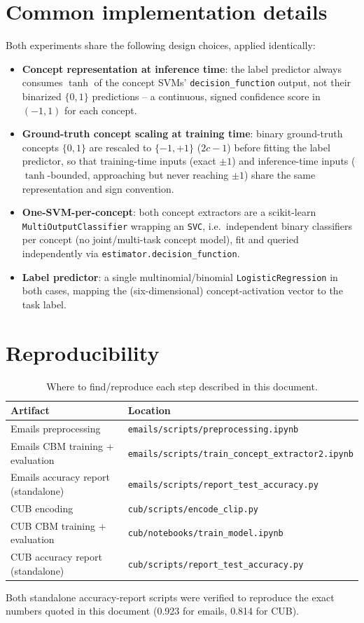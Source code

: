 \documentclass[11pt]{article}
\newcommand{\code}[1]{\texttt{#1}}
\begin{document}
\section{Common implementation details}

Both experiments share the following design choices, applied identically:

\begin{itemize}[leftmargin=*]
    \item \textbf{Concept representation at inference time}: the label
    predictor always consumes $\tanh$ of the concept SVMs'
    \code{decision\_function} output, not their binarized $\{0,1\}$
    predictions -- a continuous, signed confidence score in $(-1, 1)$ for
    each concept.
    \item \textbf{Ground-truth concept scaling at training time}: binary
    ground-truth concepts $\{0,1\}$ are rescaled to $\{-1,+1\}$
    ($2c - 1$) before fitting the label predictor, so that training-time
    inputs (exact $\pm 1$) and inference-time inputs
    ($\tanh$-bounded, approaching but never reaching $\pm 1$) share the
    same representation and sign convention.
    \item \textbf{One-SVM-per-concept}: both concept extractors are a
    scikit-learn \code{MultiOutputClassifier} wrapping an \code{SVC},
    i.e.\ independent binary classifiers per concept (no joint/multi-task
    concept model), fit and queried independently via
    \code{estimator.decision\_function}.
    \item \textbf{Label predictor}: a single multinomial/binomial
    \code{LogisticRegression} in both cases, mapping the (six-dimensional)
    concept-activation vector to the task label.
\end{itemize}

\section{Reproducibility}

\begin{table}[h]
\centering
\begin{tabular}{ll}
\toprule
Artifact & Location \\
\midrule
Emails preprocessing & \code{emails/scripts/preprocessing.ipynb} \\
Emails CBM training + evaluation & \code{emails/scripts/train\_concept\_extractor2.ipynb} \\
Emails accuracy report (standalone) & \code{emails/scripts/report\_test\_accuracy.py} \\
CUB encoding & \code{cub/scripts/encode\_clip.py} \\
CUB CBM training + evaluation & \code{cub/notebooks/train\_model.ipynb} \\
CUB accuracy report (standalone) & \code{cub/scripts/report\_test\_accuracy.py} \\
\bottomrule
\end{tabular}
\caption{Where to find/reproduce each step described in this document.}
\end{table}

Both standalone accuracy-report scripts were verified to reproduce the
exact numbers quoted in this document (0.923 for emails, 0.814 for CUB).
\end{document}
